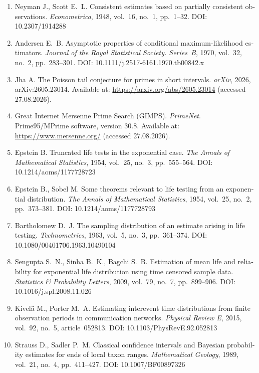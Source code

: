 \documentclass[11pt,a4paper]{article}
\theoremstyle{plain}
\theoremstyle{remark}
\begin{document}
\begin{otherlanguage}{english}
\begin{enumerate}
\item Neyman J., Scott E.~L. Consistent estimates based on partially consistent
observations. \emph{Econometrica}, 1948, vol.~16, no.~1, pp.~1--32.
DOI: 10.2307/1914288

\item Andersen E.~B. Asymptotic properties of conditional maximum-likelihood
estimators. \emph{Journal of the Royal Statistical Society. Series~B}, 1970,
vol.~32, no.~2, pp.~283--301. DOI: 10.1111/j.2517-6161.1970.tb00842.x

\item Jha A. The Poisson tail conjecture for primes in short intervals.
\emph{arXiv}, 2026, arXiv:2605.23014. Available at:
\url{https://arxiv.org/abs/2605.23014} (accessed 27.08.2026).

\item Great Internet Mersenne Prime Search (GIMPS). \emph{PrimeNet}.
Prime95/MPrime software, version 30.8. Available at:
\url{https://www.mersenne.org/} (accessed 27.08.2026).

\item Epstein B. Truncated life tests in the exponential case.
\emph{The Annals of Mathematical Statistics}, 1954, vol.~25, no.~3,
pp.~555--564. DOI: 10.1214/aoms/1177728723

\item Epstein B., Sobel M. Some theorems relevant to life testing from an
exponential distribution. \emph{The Annals of Mathematical Statistics}, 1954,
vol.~25, no.~2, pp.~373--381. DOI: 10.1214/aoms/1177728793

\item Bartholomew D.~J. The sampling distribution of an estimate arising in
life testing. \emph{Technometrics}, 1963, vol.~5, no.~3, pp.~361--374.
DOI: 10.1080/00401706.1963.10490104

\item Sengupta S.~N., Sinha B.~K., Bagchi S.~B. Estimation of mean life and
reliability for exponential life distribution using time censored sample data.
\emph{Statistics \& Probability Letters}, 2009, vol.~79, no.~7, pp.~899--906.
DOI: 10.1016/j.spl.2008.11.026

\item Kivel\"{a} M., Porter M.~A. Estimating interevent time distributions
from finite observation periods in communication networks.
\emph{Physical Review E}, 2015, vol.~92, no.~5, article~052813.
DOI: 10.1103/PhysRevE.92.052813

\item Strauss D., Sadler P.~M. Classical confidence intervals and Bayesian
probability estimates for ends of local taxon ranges. \emph{Mathematical
Geology}, 1989, vol.~21, no.~4, pp.~411--427. DOI: 10.1007/BF00897326


\end{enumerate}
\end{otherlanguage}
\end{document}
